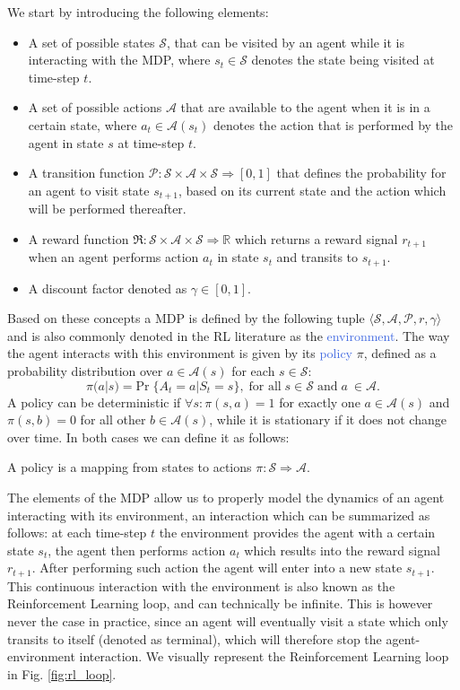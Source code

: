 We start by introducing the following elements:
\begin{itemize}
	\item A set of possible states $\mathcal{S}$, that can be visited by an agent while it is interacting with the MDP, where $s_t \in \mathcal{S}$ denotes the state being visited at time-step $t$.
	\item A set of possible actions $\mathcal{A}$ that are available to the agent when it is in a certain state, where $a_t \in \mathcal{A}(s_t)$ denotes the action that is performed by the agent in state $s$ at time-step $t$.
\item A transition function $\mathcal{P}:\mathcal{S}\times\mathcal{A}\times\mathcal{S}\Rightarrow [0,1]$ that defines the probability for an agent to visit state $s_{t+1}$, based on its current state and the action which will be performed thereafter.
\item A reward function $\Re:\mathcal{S}\times\mathcal{A}\times\mathcal{S}\Rightarrow \mathbb{R}$ which returns a reward signal $r_{t+1}$ when an agent performs action $a_t$ in state $s_t$ and transits to $s_{t+1}$.
\item A discount factor denoted as $\gamma \in [0,1]$.

\end{itemize}

Based on these concepts a MDP is defined by the following tuple $\langle\mathcal{S}, \mathcal{A}, \mathcal{P}, r, \gamma\rangle$ and is also commonly denoted in the RL literature as the \textcolor{RoyalBlue}{environment}. The way the agent interacts with this environment is given by its \textcolor{RoyalBlue}{policy} $\pi$, defined as a probability distribution over $a \in \mathcal{A}(s)$ for each $s \in \mathcal{S}$:
\begin{equation}
	\pi(a|s) = \text{Pr}\; \{A_t = a | S_t = s\}, \; \text{for all}\; s \in \mathcal{S}\; \text{and}\; a\ \in \mathcal{A}. 
\end{equation}
A policy can be deterministic if $\forall s:\pi(s,a) = 1$ for exactly one $a \in \mathcal{A}(s)$ and $\pi(s,b)=0$ for all other $b \in \mathcal{A}(s)$, while it is stationary if it does not change over time. In both cases 
we can define it as follows:
\begin{definition}
	A policy is a mapping from states to actions $\pi:\mathcal{S}\Rightarrow\mathcal{A}$. 
\end{definition}
The elements of the MDP allow us to properly model the dynamics of an agent interacting with its environment, an interaction which can be summarized as follows: at each time-step $t$ the environment provides the agent with a certain state $s_t$, the agent then performs action $a_t$ which results into the reward signal $r_{t+1}$. After performing such action the agent will enter into a new state $s_{t+1}$. This continuous interaction with the environment is also known as the Reinforcement Learning loop, and can technically be infinite. This is however never the case in practice, since an agent will eventually visit a state which only transits to itself (denoted as terminal), which will therefore stop the agent-environment interaction. We visually represent the Reinforcement Learning loop in Fig. \ref{fig:rl_loop}.

